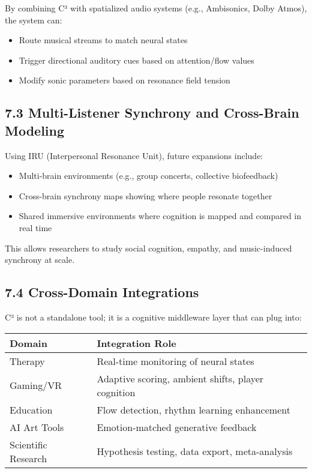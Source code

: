 By combining C³ with spatialized audio systems (e.g., Ambisonics, Dolby Atmos), the system can:

\begin{itemize}
    \item Route musical streams to match neural states
    \item Trigger directional auditory cues based on attention/flow values
    \item Modify sonic parameters based on resonance field tension
\end{itemize}

\subsection*{7.3 Multi-Listener Synchrony and Cross-Brain Modeling}

Using IRU (Interpersonal Resonance Unit), future expansions include:

\begin{itemize}
    \item Multi-brain environments (e.g., group concerts, collective biofeedback)
    \item Cross-brain synchrony maps showing where people resonate together
    \item Shared immersive environments where cognition is mapped and compared in real time
\end{itemize}

This allows researchers to study social cognition, empathy, and music-induced synchrony at scale.

\subsection*{7.4 Cross-Domain Integrations}

C³ is not a standalone tool; it is a cognitive middleware layer that can plug into:

\begin{center}
\begin{tabular}{|l|p{9cm}|}
\hline
\textbf{Domain} & \textbf{Integration Role} \\
\hline
Therapy & Real-time monitoring of neural states \\
Gaming/VR & Adaptive scoring, ambient shifts, player cognition \\
Education & Flow detection, rhythm learning enhancement \\
AI Art Tools & Emotion-matched generative feedback \\
Scientific Research & Hypothesis testing, data export, meta-analysis \\
\hline
\end{tabular}
\end{center}

